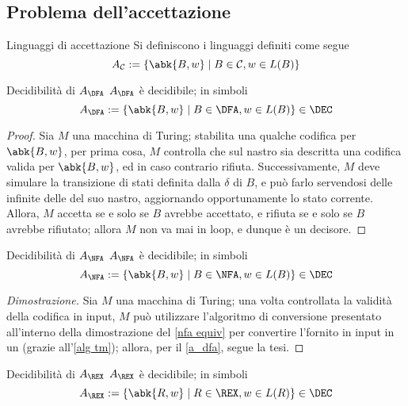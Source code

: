 \documentclass[a4paper, 12pt]{report}
\begin{document}
    \subsection{Problema dell'accettazione}

    \begin{frameddefn}{Linguaggi di accettazione}
        Si definiscono  i linguaggi definiti come segue $$A_\mathcal{C} := \{\abk{B, w} \mid B \in \mathcal{C} , w \in L(B)\}$$
    \end{frameddefn}

    \begin{framedthm}[label={a_dfa}]{Decidibilità di $A_\DFA$}
        $A_\DFA$ è decidibile; in simboli $$A_\DFA := \{\abk{B, w} \mid B \in \DFA, w \in L(B)\} \in \DEC$$
    \end{framedthm}

    \begin{proof}
        Sia $M$ una macchina di Turing; stabilita una qualche codifica per $\abk{B, w}$, per prima cosa, $M$ controlla che sul nastro sia descritta una codifica valida per $\abk{B,w}$, ed in caso contrario rifiuta. Successivamente, $M$ deve simulare la transizione di stati definita dalla $\delta$ di $B$, e può farlo servendosi delle infinite delle del suo nastro, aggiornando opportunamente lo stato corrente. Allora, $M$ accetta se e solo se $B$ avrebbe accettato, e rifiuta se e solo se $B$ avrebbe rifiutato; allora $M$ non va mai in loop, e dunque è un decisore.
    \end{proof}

    \begin{framedthm}[label={a_nfa}]{Decidibilità di $A_\NFA$}
        $A_\NFA$ è decidibile; in simboli $$A_\NFA := \{\abk{B, w} \mid B \in \NFA, w \in L(B)\} \in \DEC$$
    \end{framedthm}

    \begin{proof}[Dimostrazione]
        Sia $M$ una macchina di Turing; una volta controllata la validità della codifica in input, $M$ può utilizzare l'algoritmo di conversione presentato all'interno della dimostrazione del \cref{nfa equiv} per convertire l'\NFA fornito in input in un \DFA(grazie all'\cref{alg tm}); allora, per il \cref{a_dfa}, segue la tesi.
    \end{proof}

    \begin{framedthm}{Decidibilità di $A_\REX$}
        $A_\REX$ è decidibile; in simboli $$A_\REX := \{\abk{R, w} \mid R \in \REX, w \in L(R)\} \in \DEC$$
    \end{framedthm}
\end{document}
